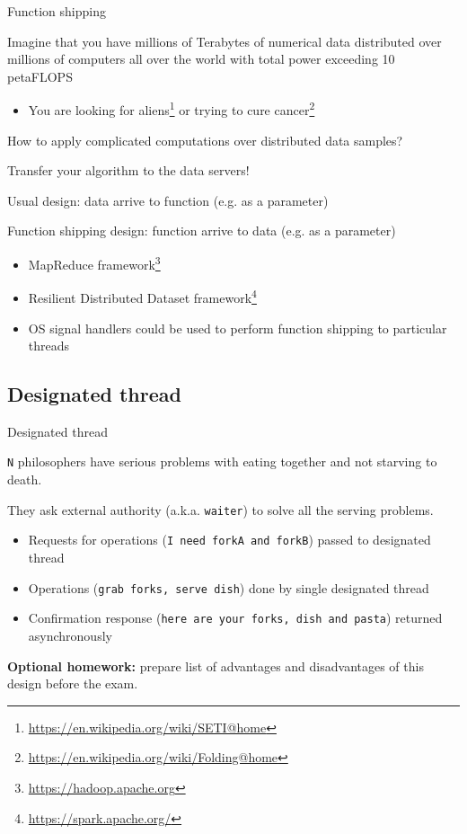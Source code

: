 \begin{frame}{Function shipping}

Imagine that you have millions of Terabytes of numerical data distributed over millions of computers all over the world with total power exceeding 10 petaFLOPS
\begin{itemize}
    \item You are looking for aliens\footnote{\tiny\url{https://en.wikipedia.org/wiki/SETI@home}} or trying to cure cancer\footnote{\tiny\url{https://en.wikipedia.org/wiki/Folding@home}}
\end{itemize}

\pause

How to apply complicated computations over distributed data samples?

\pause

Transfer your algorithm to the data servers!

\pause

Usual design: data arrive to function (e.g. as a parameter)

\pause

Function shipping design: function arrive to data (e.g. as a parameter)

\pause
\begin{itemize}
    \item MapReduce framework\footnote<6->{\tiny\url{https://hadoop.apache.org}}
    \item Resilient Distributed Dataset framework\footnote<6->{\tiny\url{https://spark.apache.org/}}
    \pause
    \item OS signal handlers could be used to perform function shipping to particular threads
\end{itemize}
\end{frame}

\subsection{Designated thread}
\showTOCSub

\begin{frame}{Designated thread}

\texttt{N} philosophers have serious problems with eating together and not starving to death.

\pause

They ask external authority (a.k.a. \texttt{waiter}) to solve all the serving problems.

\pause
\begin{itemize}
    \item Requests for operations (\texttt{I need forkA and forkB}) passed to designated thread
    \item Operations (\texttt{grab forks, serve dish}) done by single designated thread
    \item Confirmation response (\texttt{here are your forks, dish and pasta}) returned asynchronously
\end{itemize}

\pause
\textbf{Optional homework:} prepare list of advantages and disadvantages of this design before the exam.

\end{frame}


